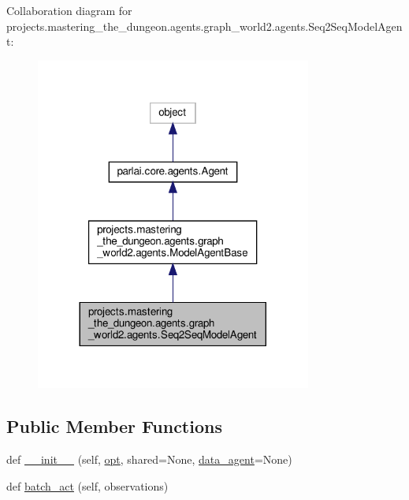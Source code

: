 Collaboration diagram for projects.\+mastering\+\_\+the\+\_\+dungeon.\+agents.\+graph\+\_\+world2.\+agents.\+Seq2\+Seq\+Model\+Agent\+:
\nopagebreak
\begin{figure}[H]
\begin{center}
\leavevmode
\includegraphics[width=257pt]{d1/da0/classprojects_1_1mastering__the__dungeon_1_1agents_1_1graph__world2_1_1agents_1_1Seq2SeqModelAgent__coll__graph}
\end{center}
\end{figure}
\subsection*{Public Member Functions}
\begin{DoxyCompactItemize}
\item 
def \hyperlink{classprojects_1_1mastering__the__dungeon_1_1agents_1_1graph__world2_1_1agents_1_1Seq2SeqModelAgent_a355995e11c4f10e710dab06afa743373}{\+\_\+\+\_\+init\+\_\+\+\_\+} (self, \hyperlink{classparlai_1_1core_1_1agents_1_1Agent_ab3b45d2754244608c75d4068b90cd051}{opt}, shared=None, \hyperlink{classprojects_1_1mastering__the__dungeon_1_1agents_1_1graph__world2_1_1agents_1_1ModelAgentBase_a229b7901e20dced7e3b3c3e2d381d2ce}{data\+\_\+agent}=None)
\item 
def \hyperlink{classprojects_1_1mastering__the__dungeon_1_1agents_1_1graph__world2_1_1agents_1_1Seq2SeqModelAgent_a4a6f60aa35a0fcf6e033cf2fef28342b}{batch\+\_\+act} (self, observations)
\end{DoxyCompactItemize}
